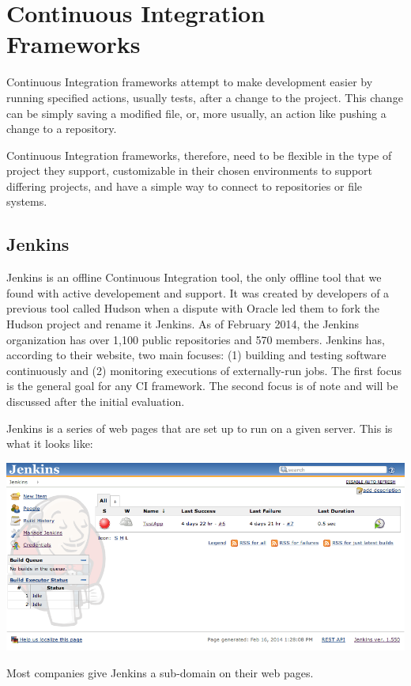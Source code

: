 \documentclass[12pt]{ucthesis}
\newenvironment{Figure}
  {\par\medskip\noindent\minipage{\linewidth}}
  {\endminipage\par\medskip}
\begin{document}
\section{Continuous Integration Frameworks}
Continuous Integration frameworks attempt to make development easier by running specified actions, usually tests, after a change to the project. This change can be simply saving a modified file, or, more usually, an action like pushing a change to a repository.

Continuous Integration frameworks, therefore, need to be flexible in the type of project they support, customizable in their chosen environments to support differing projects, and have a simple way to connect to repositories or file systems.

\subsection{Jenkins}
Jenkins\cite{Jenkins} is an offline Continuous Integration tool, the only offline tool that we found with active developement and support. It was created by developers of a previous tool called Hudson when a dispute with Oracle led them to fork the Hudson project and rename it Jenkins. As of February 2014, the Jenkins organization has over 1,100 public repositories and 570 members\cite{JenkinsGitHub}. Jenkins has, according to their website, two main focuses: (1) building and testing software continuously and (2) monitoring executions of externally-run jobs. The first focus is the general goal for any CI framework. The second focus is of note and will be discussed after the initial evaluation. 

Jenkins is a series of web pages that are set up to run on a given server. This is what it looks like:
\begin{Figure}
  \centering
  \includegraphics[width=0.95\linewidth]{jenkins.png}

\end{Figure}
Most companies give Jenkins a sub-domain on their web pages.
\end{document}
